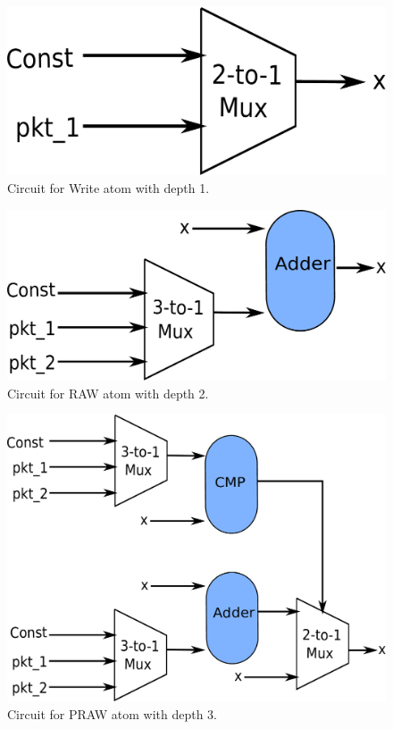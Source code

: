 \newpage 
\begin{figure}[!htbp]
  \includegraphics[width=\columnwidth]{rw.pdf}
  \caption{Circuit for Write atom with depth 1.}
  \label{fig:rw}
\end{figure}
\begin{figure}[!htbp]
  \includegraphics[width=\columnwidth]{raw.pdf}
  \caption{Circuit for RAW atom with depth 2.}
  \label{fig:raw}
\end{figure}
\begin{figure}[!htbp]
  \includegraphics[width=\columnwidth]{pred_raw.pdf}
  \caption{Circuit for PRAW atom with depth 3.}
  \label{fig:praw}
\end{figure}
